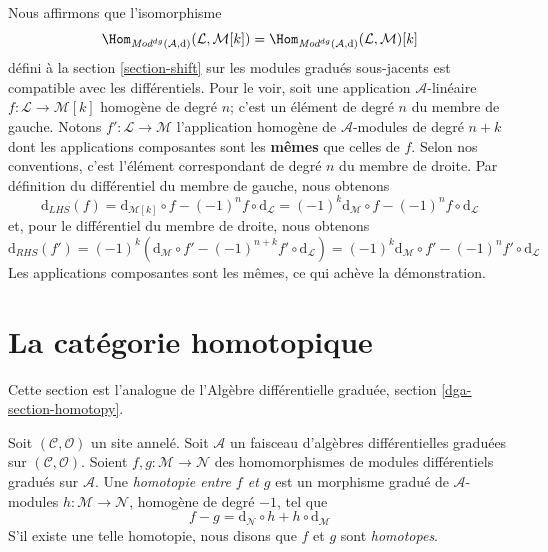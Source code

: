 \medskip\noindent
Nous affirmons que l'isomorphisme
$$
\Hom_{\textit{Mod}^{dg}(\mathcal{A}, \text{d})}(\mathcal{L}, \mathcal{M}[k])
=
\Hom_{\textit{Mod}^{dg}(\mathcal{A}, \text{d})}(\mathcal{L}, \mathcal{M})[k]
$$
défini à la section \ref{section-shift} sur les modules gradués sous-jacents est compatible avec les différentiels.
Pour le voir, soit une application $\mathcal{A}$-linéaire $f : \mathcal{L} \to \mathcal{M}[k]$ homogène de degré $n$; c'est un élément de degré $n$ du membre de gauche.
Notons $f' : \mathcal{L} \to \mathcal{M}$ l'application homogène de $\mathcal{A}$-modules de degré $n + k$ dont les applications composantes sont les {\bf mêmes} que celles de $f$.
Selon nos conventions, c'est l'élément correspondant de degré $n$ du membre de droite.
Par définition du différentiel du membre de gauche, nous obtenons
$$
\text{d}_{LHS}(f) =
\text{d}_{\mathcal{M}[k]} \circ f - (-1)^n f \circ \text{d}_\mathcal{L} =
(-1)^k\text{d}_\mathcal{M} \circ f - (-1)^n f \circ \text{d}_\mathcal{L}
$$
et, pour le différentiel du membre de droite, nous obtenons
$$
\text{d}_{RHS}(f') =
(-1)^k\left(
\text{d}_\mathcal{M} \circ f' - (-1)^{n + k} f' \circ \text{d}_\mathcal{L}
\right) =
(-1)^k\text{d}_\mathcal{M} \circ f' - (-1)^n f' \circ \text{d}_\mathcal{L}
$$
Les applications composantes sont les mêmes, ce qui achève la démonstration.










\section{La catégorie homotopique}
\label{section-homotopy}

\noindent
Cette section est l'analogue de l'Algèbre différentielle graduée, section \ref{dga-section-homotopy}.

\begin{definition}
\label{definition-homotopy}
Soit $(\mathcal{C}, \mathcal{O})$ un site annelé.
Soit $\mathcal{A}$ un faisceau d'algèbres différentielles graduées sur $(\mathcal{C}, \mathcal{O})$.
Soient $f, g : \mathcal{M} \to \mathcal{N}$ des homomorphismes de modules différentiels gradués sur $\mathcal{A}$.
Une {\it homotopie entre $f$ et $g$} est un morphisme gradué de $\mathcal{A}$-modules $h : \mathcal{M} \to \mathcal{N}$, homogène de degré $-1$, tel que
$$
f - g = \text{d}_\mathcal{N} \circ h + h \circ \text{d}_\mathcal{M}
$$
S'il existe une telle homotopie, nous disons que $f$ et $g$ sont {\it homotopes}.
\end{definition}

